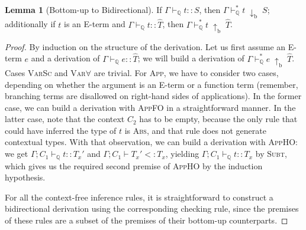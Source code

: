 \documentclass[10pt,preprint]{sigplanconf-pldi16}
\theoremstyle{definition}
\newtheorem{lemma}{Lemma}
\newcommand{\Subt}{<:}
\newcommand{\env}{\Gamma}
\newcommand{\produceB}{\;{\mathrm{\uparrow_b}}\;}
\newcommand{\consumeB}{\;{\mathrm{\downarrow_b}}\;}
\newcommand{\quals}{\mathbb{Q}}
\newcommand{\entailsQ}{\vdash_{\quals}}
\begin{document}
\begin{lemma}[Bottom-up to Bidirectional]\label{lemma:bu-to-bidir}
If $\env\entailsQ t :: S$, then $\env \entailsQ^* t \consumeB S$;
additionally if $t$ is an E-term and $\env\entailsQ t :: \hat{T}$, then $\env \entailsQ^* t \produceB \hat{T}$.
\end{lemma}
\begin{proof}
By induction on the structure of the derivation.
Let us first assume an E-term $e$ and a derivation of $\env \entailsQ e :: \hat{T}$;
we will build a derivation of $\env \entailsQ^* e \produceB \hat{T}$.
Cases \textsc{VarSc} and \textsc{Var$\forall$} are trivial.
For \textsc{App}, we have to consider two cases,
depending on whether the argument is an E-term or a function term
(remember, branching terms are disallowed on right-hand sides of applications).
In the former case, we can build a derivation with \textsc{AppFO} in a straightforward manner.
In the latter case, note that the context $C_2$ has to be empty,
because the only rule that could have inferred the type of $t$ is \textsc{Abs},
and that rule does not generate contextual types.
With that observation, we can build a derivation with \textsc{AppHO}: 
we get $\env;C_1\entailsQ t :: T_x'$ and $\env;C_1\vdash T_x'\Subt T_x$,
yielding $\env;C_1\entailsQ t :: T_x$ by \textsc{Subt},
which gives us the required second premise of \textsc{AppHO} by the induction hypothesis.

For all the context-free inference rules,
it is straightforward to construct a bidirectional derivation
using the corresponding checking rule,
since the premises of these rules are a subset of the premises of their bottom-up counterparts.
\end{proof}
\end{document}
